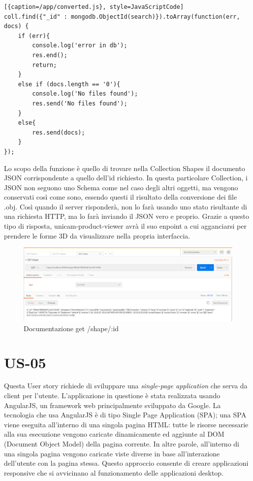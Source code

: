 \begin{lstlisting}[{caption=/app/converted.js}, style=JavaScriptCode]
coll.find({"_id" : mongodb.ObjectId(search)}).toArray(function(err, docs) {
	if (err){
		console.log('error in db');
		res.end();
		return;
	}
	else if (docs.length == '0'){
		console.log('No files found');
		res.send('No files found');
	}
	else{
		res.send(docs);
	}
});
\end{lstlisting}
Lo scopo della funzione è quello di trovare nella Collection Shapes il documento JSON corrispondente a quello dell'id richiesto. In questa particolare Collection, i JSON non seguono uno Schema come nel caso degli altri oggetti, ma vengono conservati così come sono, essendo questi il risultato della conversione dei file .obj. Così quando il server risponderà, non lo farà usando uno stato risultante di una richiesta HTTP, ma lo farà inviando il JSON vero e proprio. Grazie a questo tipo di risposta, unicam-product-viewer avrà il suo enpoint a cui agganciarsi per prendere le forme 3D da visualizzare nella propria interfaccia.
\begin{figure}[h]
	\centering
	\includegraphics[scale=0.42]{Immagini/get_shape.png}
	\caption{Documentazione get /shape/:id}
\end{figure}
\section{US-05}
Questa User story richiede di sviluppare una \emph{single-page application} che serva da client per l'utente. L'applicazione in questione è stata realizzata usando AngularJS\index, un framework web principalmente sviluppato da Google. La tecnologia che usa AngularJS è di tipo Single Page Application (SPA); una SPA viene eseguita all’interno di una singola pagina HTML: tutte le risorse necessarie alla sua esecuzione vengono caricate dinamicamente ed aggiunte al DOM (Document Object Model) della pagina corrente. In altre parole, all’interno di una singola pagina vengono caricate viste diverse in base all’interazione dell’utente con la pagina stessa. Questo approccio consente di creare applicazioni responsive che si avvicinano al funzionamento delle applicazioni desktop.

